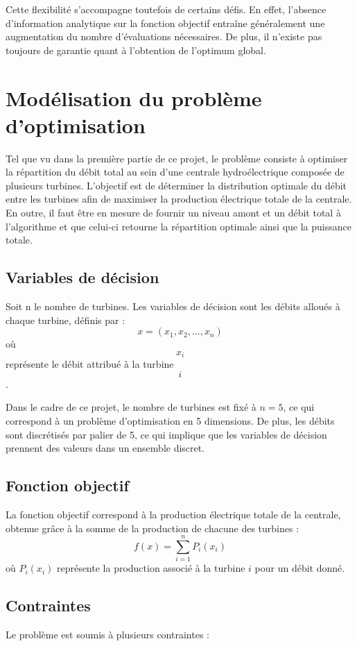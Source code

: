 \documentclass[12pt, letterpaper]{report}
\begin{document}
Cette flexibilité s'accompagne toutefois de certains défis. En effet, l'absence d'information analytique sur la fonction objectif entraîne généralement une augmentation du nombre d'évaluations nécessaires. De plus, il n'existe pas toujours de garantie quant à l'obtention de l'optimum global.

\chapter{Modélisation du problème d'optimisation}
Tel que vu dans la première partie de ce projet, le problème consiste à optimiser la répartition du débit total au sein d'une centrale hydroélectrique composée de plusieurs turbines.  L'objectif est de déterminer la distribution optimale du débit entre les turbines afin de maximiser la production électrique totale de la centrale.  En outre, il faut être en mesure de fournir un niveau amont et un débit total à l'algorithme et que celui-ci retourne la répartition optimale ainsi que la puissance totale.

\section{Variables de décision}
Soit n le nombre de turbines.  Les variables de décision sont les débits alloués à chaque turbine, définis par : 
\[
x = (x_1, x_2, \ldots, x_n)
\]
où \[x_i\] représente le débit attribué à la turbine \[i\].

Dans le cadre de ce projet, le nombre de turbines est fixé à \(n = 5\), ce qui correspond à un problème d'optimisation en 5 dimensions.  De plus, les débits sont discrétisés par palier de 5, ce qui implique que les variables de décision prennent des valeurs dans un ensemble discret.

\section{Fonction objectif}
La fonction objectif correspond à la production électrique totale de la centrale, obtenue grâce à la somme de la production de chacune des turbines :
\[
f(x) = \sum_{i=1}^{n} P_i(x_i)
\]
où \(P_i(x_i)\) représente la production associé à la turbine \(i\) pour un débit donné.

\section{Contraintes}
Le problème est soumis à plusieurs contraintes :
\end{document}
